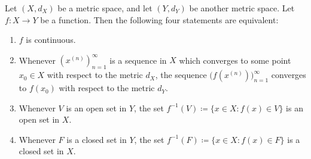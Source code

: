 \begin{thm}\label{2.1.5}
  Let \((X, d_X)\) be a metric space, and let \((Y, d_Y)\) be another metric space.
  Let \(f : X \to Y\) be a function.
  Then the following four statements are equivalent:
  \begin{enumerate}
    \item \(f\) is continuous.
    \item Whenever \((x^{(n)})_{n = 1}^\infty\) is a sequence in \(X\) which converges to some point \(x_0 \in X\) with respect to the metric \(d_X\), the sequence \(\big(f(x^{(n)})\big)_{n = 1}^\infty\) converges to \(f(x_0)\) with respect to the metric \(d_Y\).
    \item Whenever \(V\) is an open set in \(Y\), the set \(f^{-1}(V) \coloneqq \{x \in X : f(x) \in V\}\) is an open set in \(X\).
    \item Whenever \(F\) is a closed set in \(Y\), the set \(f^{-1}(F) \coloneqq \{x \in X : f(x) \in F\}\) is a closed set in \(X\).
  \end{enumerate}
\end{thm}

